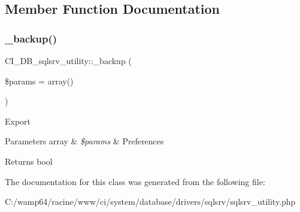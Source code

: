 \subsection{Member Function Documentation}
\mbox{\label{class_c_i___d_b__sqlsrv__utility_afe39f6e41622981454ddc5f10d8fe24e}} 
\subsubsection{\texorpdfstring{\+\_\+backup()}{\_backup()}}
{\footnotesize\ttfamily C\+I\+\_\+\+D\+B\+\_\+sqlsrv\+\_\+utility\+::\+\_\+backup (\begin{DoxyParamCaption}\item[{}]{\$params = {\ttfamily array()} }\end{DoxyParamCaption})\hspace{0.3cm}{\ttfamily [protected]}}

Export


\begin{DoxyParams}[1]{Parameters}
array & {\em \$params} & Preferences \\
\hline
\end{DoxyParams}
\begin{DoxyReturn}{Returns}
bool 
\end{DoxyReturn}


The documentation for this class was generated from the following file\+:\begin{DoxyCompactItemize}
\item 
C\+:/wamp64/racine/www/ci/system/database/drivers/sqlsrv/sqlsrv\+\_\+utility.\+php\end{DoxyCompactItemize}
